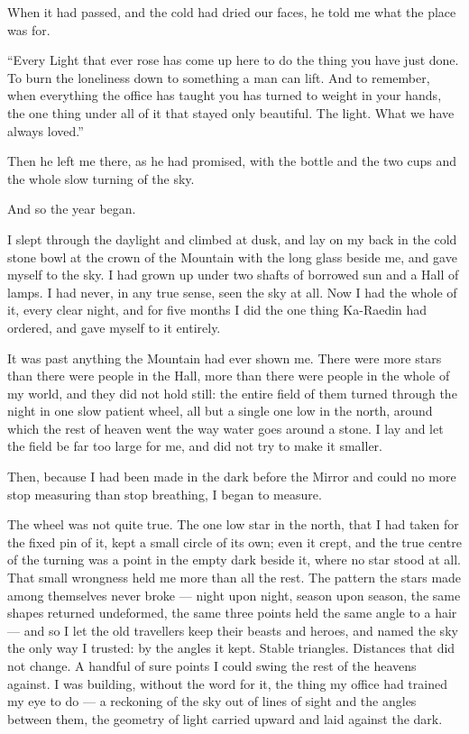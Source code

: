 When it had passed, and the cold had dried our faces, he told me what the place was for.\par

``Every Light that ever rose has come up here to do the thing you have just done. To burn the loneliness down to something a man can lift. And to remember, when everything the office has taught you has turned to weight in your hands, the one thing under all of it that stayed only beautiful. The light. What we have always loved.''\par

Then he left me there, as he had promised, with the bottle and the two cups and the whole slow turning of the sky.\par

And so the year began.\par

I slept through the daylight and climbed at dusk, and lay on my back in the cold stone bowl at the crown of the Mountain with the long glass beside me, and gave myself to the sky. I had grown up under two shafts of borrowed sun and a Hall of lamps. I had never, in any true sense, seen the sky at all. Now I had the whole of it, every clear night, and for five months I did the one thing Ka-Raedin had ordered, and gave myself to it entirely.\par

It was past anything the Mountain had ever shown me. There were more stars than there were people in the Hall, more than there were people in the whole of my world, and they did not hold still: the entire field of them turned through the night in one slow patient wheel, all but a single one low in the north, around which the rest of heaven went the way water goes around a stone. I lay and let the field be far too large for me, and did not try to make it smaller.\par

Then, because I had been made in the dark before the Mirror and could no more stop measuring than stop breathing, I began to measure.\par

The wheel was not quite true. The one low star in the north, that I had taken for the fixed pin of it, kept a small circle of its own; even it crept, and the true centre of the turning was a point in the empty dark beside it, where no star stood at all. That small wrongness held me more than all the rest. The pattern the stars made among themselves never broke --- night upon night, season upon season, the same shapes returned undeformed, the same three points held the same angle to a hair --- and so I let the old travellers keep their beasts and heroes, and named the sky the only way I trusted: by the angles it kept. Stable triangles. Distances that did not change. A handful of sure points I could swing the rest of the heavens against. I was building, without the word for it, the thing my office had trained my eye to do --- a reckoning of the sky out of lines of sight and the angles between them, the geometry of light carried upward and laid against the dark.\par

